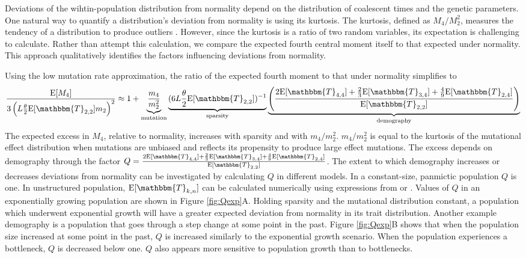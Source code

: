 Deviations of the wihtin-population distribution from normality depend on the
distribution of coalescent times and the genetic parameters. One natural way to
quantify a distribution's deviation from normality is using its kurtosis. The
kurtosis, defined as $M_4/M_2^2$, measures the tendency of a distribution to
produce outliers \citep{Westfall2014}. However, since the kurtosis is a ratio of
two random variables, its expectation is challenging to calculate. Rather than
attempt this calculation, we compare the expected fourth central moment itself
to that expected under normality. This approach qualitatively identifies the
factors influencing deviations from normality.

Using the low mutation rate approximation, the ratio of the expected fourth
moment to that under normality simplifies to
\begin{equation}
  \label{eq:popmom4coal}
  \frac{\E[M_4]}{3\left(L \T \E[\mathbbm{T}_{2,2}] m_2\right)^2} \approx 1 +
  \underbrace{\frac{m_4}{m_2^2}}_{\text{mutation}} \underbrace{(6 L \T \E[\mathbbm{T}_{2,2}])^{-1}}_{\text{sparsity}}
      \underbrace{\left( \frac{2\E[\mathbbm{T}_{4,4}] +
      \frac{2}{3}\E[\mathbbm{T}_{3,4}] +
      \frac{4}{9}\E[\mathbbm{T}_{2,4}]}{\E[\mathbbm{T}_{2,2}]}\right)}_{\text{demography}}
\end{equation}
The expected excess in $M_4$, relative to normality, increases with sparsity and
with $m_4/m_2^2$. $m_4/m_2^2$ is equal to the kurtosis of the mutational effect
distribution when mutations are unbiased and reflects its propensity to produce
large effect mutations. The excess depends on demography through the factor $Q
= \frac{2\E[\mathbbm{T}_{4,4}] + \frac{2}{3}\E[\mathbbm{T}_{3,4}]
+ \frac{4}{9}\E[\mathbbm{T}_{2,4}]}{\E[\mathbbm{T}_{2,2}]}$. The extent to which
demography increases or decreases deviations from normality can be investigated
by calculating $Q$ in different models. In a constant-size, panmictic population
$Q$ is one. In unstructured population, $\E[\mathbbm{T}_{k,n}]$ can be
calculated numerically using expressions from \citet{Griffiths1998}
or \citet{Polanski2003a}. Values of $Q$ in an exponentially growing population
are shown in Figure \ref{fig:Qexp}A. Holding sparsity and the mutational
distribution constant, a population which underwent exponential growth will have
a greater expected deviation from normality in its trait distribution. Another
example demography is a population that goes through a step change at some point
in the past. Figure \ref{fig:Qexp}B shows that when the population size
increased at some point in the past, $Q$ is increased similarly to the
exponential growth scenario. When the population experiences a bottleneck, $Q$
is decreased below one. $Q$ also appears more sensitive to population growth
than to bottlenecks.

